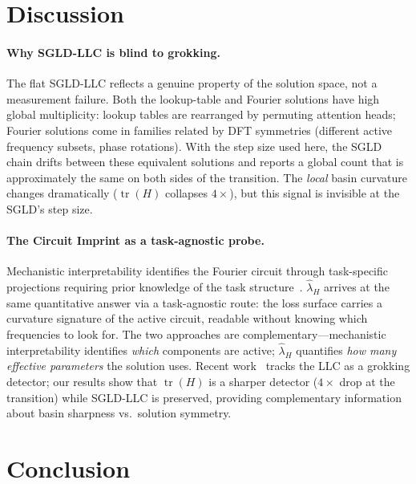 \documentclass{article}
\begin{document}
\section{Discussion}
\label{sec:discussion}

\paragraph{Why SGLD-LLC is blind to grokking.}
The flat SGLD-LLC reflects a genuine property of the solution space, not a
measurement failure.  Both the lookup-table and Fourier solutions have high
global multiplicity: lookup tables are rearranged by permuting attention
heads; Fourier solutions come in families related by DFT symmetries (different
active frequency subsets, phase rotations).  With the step size used here,
the SGLD chain drifts between these equivalent solutions and reports a
global count that is approximately the same on both sides of the transition.
The \emph{local} basin curvature changes dramatically ($\operatorname{tr}(H)$
collapses $4\times$), but this signal is invisible at the SGLD's step size.

\paragraph{The Circuit Imprint as a task-agnostic probe.}
Mechanistic interpretability identifies the Fourier circuit through
task-specific projections requiring prior knowledge of the task
structure~\citep{nanda2023progress}.
$\hat\lambda_H$ arrives at the same quantitative answer via a task-agnostic
route: the loss surface carries a curvature signature of the active circuit,
readable without knowing which frequencies to look for.
The two approaches are complementary—mechanistic interpretability identifies
\emph{which} components are active; $\hat\lambda_H$ quantifies \emph{how many
effective parameters} the solution uses.
Recent work~\citep{competing_basins2026} tracks the LLC as a grokking detector;
our results show that $\operatorname{tr}(H)$ is a sharper detector ($4\times$
drop at the transition) while SGLD-LLC is preserved, providing complementary
information about basin sharpness vs.\ solution symmetry.

\section{Conclusion}
\label{sec:conclusion}
\end{document}
